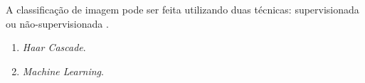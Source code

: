 A classificação de imagem pode ser feita utilizando duas técnicas: supervisionada ou não-supervisionada \cite{LIBERMAN97}.

\begin{enumerate}
    \item<1> \textit{Haar Cascade}.
    \item<1> \textit{Machine Learning}.
\end{enumerate}